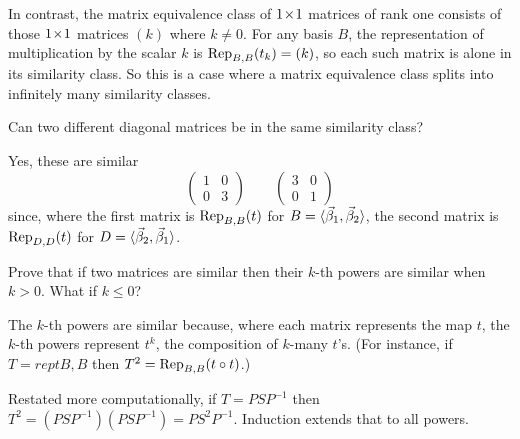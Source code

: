 \begin{exercises}
\begin{answer}
      In contrast, the matrix equivalence class of \( \nbyn{1} \) matrices
      of rank one consists of those 
      $\nbyn{1}$ matrices \( (k) \) where \( k\neq 0 \).
      For any basis \( B \), the representation
      of multiplication by the scalar \( k \)
      is \( \rep{t_k}{B,B}=(k) \),
      so each such matrix is alone in its similarity class.
      So this is a case where a matrix equivalence class splits into
      infinitely many similarity classes.  
     \end{answer}
  \item 
    Can two different diagonal matrices be in the same similarity class?
    \begin{answer}
      Yes, these are similar
      \begin{equation*}
         \begin{pmatrix}
           1  &0  \\
           0  &3
         \end{pmatrix}
         \qquad
         \begin{pmatrix}
           3  &0  \\
           0  &1
         \end{pmatrix}
      \end{equation*}
      since, where the first matrix is $\rep{t}{B,B}$ for 
      $B=\sequence{\vec{\beta}_1,\vec{\beta}_2}$, 
      the second matrix is $\rep{t}{D,D}$ for 
      $D=\sequence{\vec{\beta}_2,\vec{\beta}_1}$.
     \end{answer}
  \recommended \item
    Prove that if two matrices are similar then their \( k \)-th powers
    are similar when \( k>0 \).
    What if \( k\leq 0 \)?
    \begin{answer}
      The \( k \)-th powers are similar because, where each matrix represents
      the map $t$, the $k$-th powers represent
      \( t^k \), the composition of $k$-many $t$'s.
      (For instance, if $T=rep{t}{B,B}$ then $T^2=\rep{\composed{t}{t}}{B,B}$.)

      Restated more computationally, if \( T=PSP^{-1} \) then
      \( T^2=(PSP^{-1})(PSP^{-1})=PS^2P^{-1} \).
      Induction extends that to all powers.


\end{answer}
\end{exercises}
